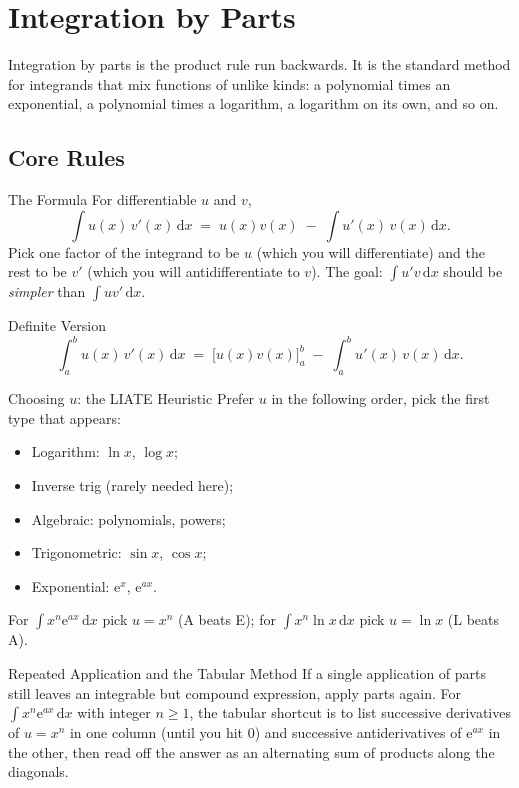 \chapter{Integration by Parts}

Integration by parts is the product rule
run backwards. It is the standard method for integrands that mix
functions of unlike kinds: a polynomial times an exponential, a polynomial times a
logarithm, a logarithm on its own, and so on.

\section{Core Rules}

\begin{rulebox}{The Formula}
For differentiable $u$ and $v$,
\[
  \int u(x)\,v'(x)\,\mathrm{d}x
    \;=\; u(x)v(x) \;-\; \int u'(x)\,v(x)\,\mathrm{d}x .
\]
Pick one factor of the integrand to be $u$ (which you will differentiate)
and the rest to be $v'$ (which you will antidifferentiate to $v$). The
goal: $\int u'v\,\mathrm{d}x$ should be \emph{simpler} than
$\int uv'\,\mathrm{d}x$.
\end{rulebox}

\begin{rulebox}{Definite Version}
\[
  \int_{a}^{b} u(x)\,v'(x)\,\mathrm{d}x
    \;=\; \bigl[u(x)v(x)\bigr]_{a}^{b} \;-\; \int_{a}^{b} u'(x)\,v(x)\,\mathrm{d}x .
\]
\end{rulebox}

\begin{rulebox}{Choosing $u$: the LIATE Heuristic}
Prefer $u$ in the following order, pick the first type that appears:
\begin{itemize}[leftmargin=1.6em,itemsep=0.3ex]
  \item Logarithm: $\ln x$, $\log x$;
  \item Inverse trig (rarely needed here);
  \item Algebraic: polynomials, powers;
  \item Trigonometric: $\sin x$, $\cos x$;
  \item Exponential: $\mathrm{e}^{x}$, $\mathrm{e}^{ax}$.
\end{itemize}
For $\int x^{n}\mathrm{e}^{ax}\,\mathrm{d}x$ pick $u=x^{n}$ (A beats E);
for $\int x^{n}\ln x\,\mathrm{d}x$ pick $u=\ln x$ (L beats A).
\end{rulebox}

\begin{rulebox}{Repeated Application and the Tabular Method}
If a single application of parts still leaves an integrable but
compound expression, apply parts again. For
$\int x^{n}\mathrm{e}^{ax}\,\mathrm{d}x$ with integer $n\geq 1$, the
tabular shortcut is to list successive derivatives of $u=x^{n}$ in one
column (until you hit $0$) and successive antiderivatives of
$\mathrm{e}^{ax}$ in the other, then read off the answer as an
alternating sum of products along the diagonals.
\end{rulebox}

